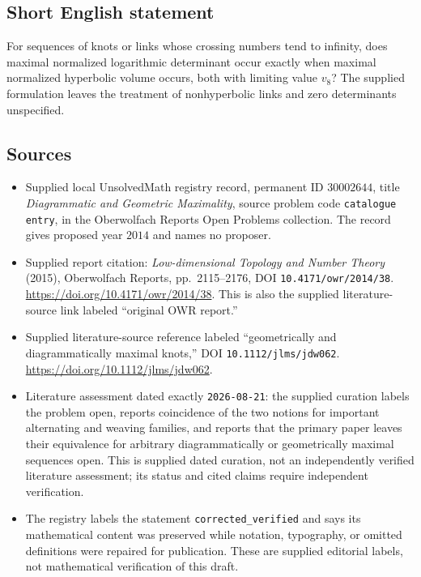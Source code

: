 \documentclass[11pt]{article}
\begin{document}
\subsection{Short English statement}
For sequences of knots or links whose crossing numbers tend to infinity, does maximal normalized logarithmic determinant occur exactly when maximal normalized hyperbolic volume occurs, both with limiting value $v_8$? The supplied formulation leaves the treatment of nonhyperbolic links and zero determinants unspecified.
\subsection{Sources}
\begin{itemize}
\item Supplied local UnsolvedMath registry record, permanent ID $30002644$, title \emph{Diagrammatic and Geometric Maximality}, source problem code \texttt{catalogue entry}, in the Oberwolfach Reports Open Problems collection. The record gives proposed year $2014$ and names no proposer.
\item Supplied report citation: \emph{Low-dimensional Topology and Number Theory} (2015), Oberwolfach Reports, pp.\ 2115--2176, DOI \texttt{10.4171/owr/2014/38}. \url{https://doi.org/10.4171/owr/2014/38}. This is also the supplied literature-source link labeled ``original OWR report.''
\item Supplied literature-source reference labeled ``geometrically and diagrammatically maximal knots,'' DOI \texttt{10.1112/jlms/jdw062}. \url{https://doi.org/10.1112/jlms/jdw062}.
\item Literature assessment dated exactly \texttt{2026-08-21}: the supplied curation labels the problem open, reports coincidence of the two notions for important alternating and weaving families, and reports that the primary paper leaves their equivalence for arbitrary diagrammatically or geometrically maximal sequences open. This is supplied dated curation, not an independently verified literature assessment; its status and cited claims require independent verification.
\item The registry labels the statement \texttt{corrected\_verified} and says its mathematical content was preserved while notation, typography, or omitted definitions were repaired for publication. These are supplied editorial labels, not mathematical verification of this draft.
\end{itemize}
\end{document}
